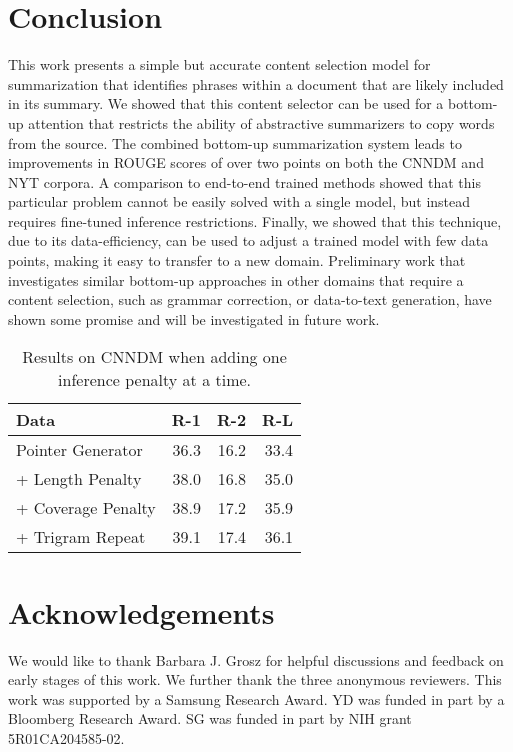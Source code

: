 \documentclass[11pt,a4paper]{article}
\begin{document}
\section{Conclusion}
This work presents a simple but accurate content selection model for summarization that identifies phrases within a document that are likely included in its summary. We showed that this content selector can be used for a bottom-up attention that restricts the ability of abstractive summarizers to copy words from the source. The combined bottom-up summarization system leads to improvements in ROUGE scores of over two points on both the \gls{CNNDM} and NYT corpora. A comparison to end-to-end trained methods showed that this particular problem cannot be easily solved with a single model, but instead requires fine-tuned inference restrictions. Finally, we showed that this technique, due to its data-efficiency, can be used to adjust a trained model with few data points, making it easy to transfer to a new domain. Preliminary work that investigates similar bottom-up approaches in other domains that require a content selection, such as grammar correction, or data-to-text generation, have shown some promise and will be investigated in future work. 


\begin{table}[t]
\centering
{}
\begin{tabular}{@{}lrrr@{}}
\toprule
Data                        & R-1  &R-2  &R-L\\ \midrule
\small{Pointer Generator}   & 36.3 &16.2 &33.4  \\
\small{+ Length Penalty}    & 38.0 &16.8 &35.0   \\
\small{+ Coverage Penalty}  & 38.9 &17.2 &35.9  \\ 
\small{+ Trigram Repeat}    & 39.1 &17.4 &36.1   \\ \bottomrule
\end{tabular}
\caption{Results on \gls{CNNDM} when adding one inference penalty at a time.}
\label{tab:inference-pen}
\end{table}

\section*{Acknowledgements}

We would like to thank Barbara J. Grosz for helpful discussions and feedback on early stages of this work. We further thank the three anonymous reviewers. This work was supported by a Samsung Research Award. YD was funded in part by a Bloomberg Research Award. SG was funded in part by NIH grant 5R01CA204585-02. 
\end{document}
